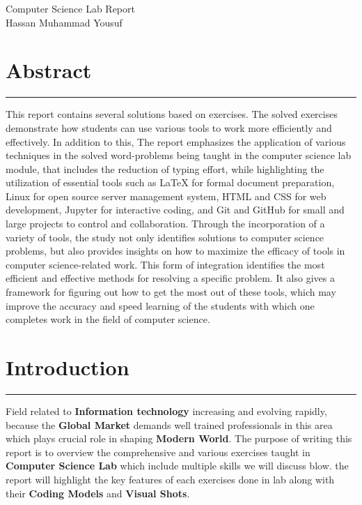 \documentclass[12pt, A4]{report}
\begin{document}
\begin{center}
    \huge{Computer Science Lab Report}\\[10pt]
    \large{Hassan Muhammad Yousuf}
\end{center}


\tableofcontents
\newpage

\section{Abstract}

\rule{\textwidth}{0.1pt}
    \noindent 
    \justifying This report contains several solutions based on exercises. The solved exercises demonstrate how students can use various tools to work more efficiently and effectively. In addition to this, The report emphasizes the application of various techniques in the solved word-problems being taught in the computer science lab module, that includes the reduction of typing effort, while highlighting the utilization of essential tools such as LaTeX for formal document preparation, Linux for open source server management system, HTML and CSS for web development, Jupyter for interactive coding, and Git and GitHub for small and large projects to control and collaboration. Through the incorporation of a variety of tools, the study not only identifies solutions to computer science problems, but also provides insights on how to maximize the efficacy of tools in computer science-related work. This form of integration identifies the most efficient and effective methods for resolving a specific problem. It also gives a framework for figuring out how to get the most out of these tools, which may improve the accuracy and speed learning of the students with which one completes work in the field of computer science.
\newpage
\section{Introduction}

\rule{\textwidth}{0.1pt}
    \noindent 
    \justifying Field related to  \textbf{Information technology} increasing and evolving rapidly, because the  \textbf{Global Market} demands well trained professionals in this area which plays  crucial role in shaping  \textbf{Modern  World}. The purpose of writing this report is to overview the comprehensive and various exercises taught in  \textbf{Computer  Science  Lab} which include multiple skills we will discuss blow. the report will highlight the key features of each exercises done in lab along with their  \textbf{Coding  Models} and  \textbf{Visual Shots}.
\end{document}
